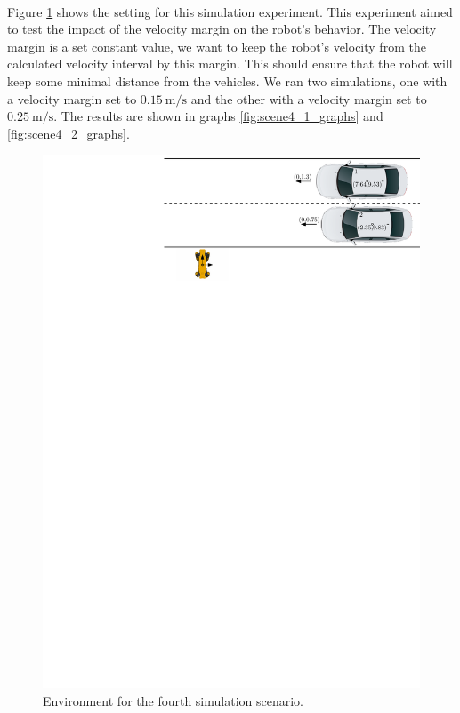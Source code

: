         \\
            Figure \ref{fig:scene4} shows the setting for this simulation experiment. This experiment aimed to test the impact of the velocity margin on the robot's behavior. The velocity margin is a set constant value, we want to keep the robot's velocity from the calculated velocity interval by this margin. This should ensure that the robot will keep some minimal distance from the vehicles. We ran two simulations, one with a velocity margin set to $0.15\:\si{\m\per\s}$ and the other with a velocity margin set to $0.25\:\si{\m\per\s}$. The results are shown in graphs \ref{fig:scene4_1_graphs} and \ref{fig:scene4_2_graphs}.\\
            \begin{figure}[H]
                \centering
                \includegraphics[width=0.95\linewidth]{images/simulations/scene4.pdf}
                \caption{Environment for the fourth simulation scenario.}
                \label{fig:scene4}
            \end{figure}
